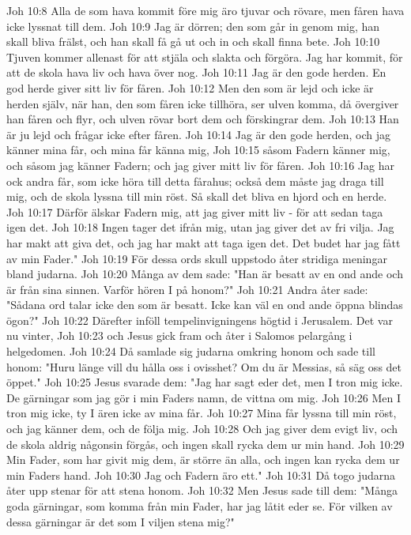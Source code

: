 Joh 10:8  Alla de som hava kommit före mig äro tjuvar och rövare, men fåren hava icke lyssnat till dem.
Joh 10:9  Jag är dörren; den som går in genom mig, han skall bliva frälst, och han skall få gå ut och in och skall finna bete.
Joh 10:10  Tjuven kommer allenast för att stjäla och slakta och förgöra. Jag har kommit, för att de skola hava liv och hava över nog.
Joh 10:11  Jag är den gode herden. En god herde giver sitt liv för fåren.
Joh 10:12  Men den som är lejd och icke är herden själv, när han, den som fåren icke tillhöra, ser ulven komma, då övergiver han fåren och flyr, och ulven rövar bort dem och förskingrar dem.
Joh 10:13  Han är ju lejd och frågar icke efter fåren.
Joh 10:14  Jag är den gode herden, och jag känner mina får, och mina får känna mig,
Joh 10:15  såsom Fadern känner mig, och såsom jag känner Fadern; och jag giver mitt liv för fåren.
Joh 10:16  Jag har ock andra får, som icke höra till detta fårahus; också dem måste jag draga till mig, och de skola lyssna till min röst. Så skall det bliva en hjord och en herde.
Joh 10:17  Därför älskar Fadern mig, att jag giver mitt liv - för att sedan taga igen det.
Joh 10:18  Ingen tager det ifrån mig, utan jag giver det av fri vilja. Jag har makt att giva det, och jag har makt att taga igen det. Det budet har jag fått av min Fader."
Joh 10:19  För dessa ords skull uppstodo åter stridiga meningar bland judarna.
Joh 10:20  Många av dem sade: "Han är besatt av en ond ande och är från sina sinnen. Varför hören I på honom?"
Joh 10:21  Andra åter sade: "Sådana ord talar icke den som är besatt. Icke kan väl en ond ande öppna blindas ögon?"
Joh 10:22  Därefter inföll tempelinvigningens högtid i Jerusalem. Det var nu vinter,
Joh 10:23  och Jesus gick fram och åter i Salomos pelargång i helgedomen.
Joh 10:24  Då samlade sig judarna omkring honom och sade till honom: "Huru länge vill du hålla oss i ovisshet? Om du är Messias, så säg oss det öppet."
Joh 10:25  Jesus svarade dem: "Jag har sagt eder det, men I tron mig icke. De gärningar som jag gör i min Faders namn, de vittna om mig.
Joh 10:26  Men I tron mig icke, ty I ären icke av mina får.
Joh 10:27  Mina får lyssna till min röst, och jag känner dem, och de följa mig.
Joh 10:28  Och jag giver dem evigt liv, och de skola aldrig någonsin förgås, och ingen skall rycka dem ur min hand.
Joh 10:29  Min Fader, som har givit mig dem, är större än alla, och ingen kan rycka dem ur min Faders hand.
Joh 10:30  Jag och Fadern äro ett."
Joh 10:31  Då togo judarna åter upp stenar för att stena honom.
Joh 10:32  Men Jesus sade till dem: "Många goda gärningar, som komma från min Fader, har jag låtit eder se. För vilken av dessa gärningar är det som I viljen stena mig?"
